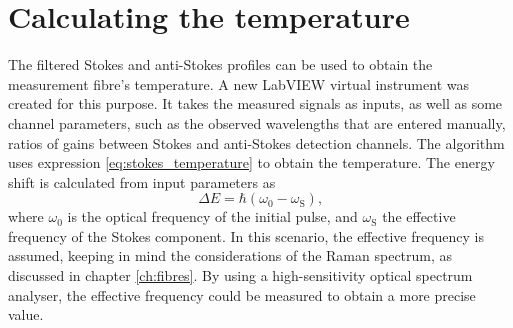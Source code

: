 \documentclass{standalone}
\begin{document}

\section{Calculating the temperature}

The filtered Stokes and anti-Stokes profiles can be used to obtain the measurement fibre's temperature. A new LabVIEW virtual instrument was created for this purpose. It takes the measured signals as inputs, as well as some channel parameters, such as the observed wavelengths that are entered manually, ratios of gains between Stokes and anti-Stokes detection channels. The algorithm uses expression \ref{eq:stokes_temperature} to obtain the temperature. The energy shift is calculated from input parameters as
\begin{equation}
\varDelta E = \hbar (\omega_0 - \omega_\textrm{S}) \textrm{,}
\end{equation}
where $\omega_0$ is the optical frequency of the initial pulse, and $\omega_\textrm{S}$ the effective frequency of the Stokes component. In this scenario, the effective frequency is assumed, keeping in mind the considerations of the Raman spectrum, as discussed in chapter \ref{ch:fibres}. By using a high-sensitivity optical spectrum analyser, the effective frequency could be measured to obtain a more precise value.






\setcounter{stranica}{\thepage}
\addtocounter{stranica}{1}
\end{document}

